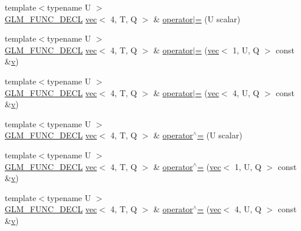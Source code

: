 \begin{DoxyCompactItemize}
\item 
{\footnotesize template$<$typename U $>$ }\\\mbox{\hyperlink{setup_8hpp_ab2d052de21a70539923e9bcbf6e83a51}{G\+L\+M\+\_\+\+F\+U\+N\+C\+\_\+\+D\+E\+CL}} \mbox{\hyperlink{structglm_1_1vec}{vec}}$<$ 4, T, Q $>$ \& \mbox{\hyperlink{structglm_1_1vec_3_014_00_01_t_00_01_q_01_4_a406f2bfe72cf1f25af84f3dc84a43b27}{operator$\vert$=}} (U scalar)
\item 
{\footnotesize template$<$typename U $>$ }\\\mbox{\hyperlink{setup_8hpp_ab2d052de21a70539923e9bcbf6e83a51}{G\+L\+M\+\_\+\+F\+U\+N\+C\+\_\+\+D\+E\+CL}} \mbox{\hyperlink{structglm_1_1vec}{vec}}$<$ 4, T, Q $>$ \& \mbox{\hyperlink{structglm_1_1vec_3_014_00_01_t_00_01_q_01_4_a147590be4731c2b2236f56d11019498f}{operator$\vert$=}} (\mbox{\hyperlink{structglm_1_1vec}{vec}}$<$ 1, U, Q $>$ const \&\mbox{\hyperlink{_s_d_l__opengl_8h_a10a82eabcb59d2fcd74acee063775f90}{v}})
\item 
{\footnotesize template$<$typename U $>$ }\\\mbox{\hyperlink{setup_8hpp_ab2d052de21a70539923e9bcbf6e83a51}{G\+L\+M\+\_\+\+F\+U\+N\+C\+\_\+\+D\+E\+CL}} \mbox{\hyperlink{structglm_1_1vec}{vec}}$<$ 4, T, Q $>$ \& \mbox{\hyperlink{structglm_1_1vec_3_014_00_01_t_00_01_q_01_4_a887b2dab7b2fdd88f5d7437fd3ad7b6e}{operator$\vert$=}} (\mbox{\hyperlink{structglm_1_1vec}{vec}}$<$ 4, U, Q $>$ const \&\mbox{\hyperlink{_s_d_l__opengl_8h_a10a82eabcb59d2fcd74acee063775f90}{v}})
\item 
{\footnotesize template$<$typename U $>$ }\\\mbox{\hyperlink{setup_8hpp_ab2d052de21a70539923e9bcbf6e83a51}{G\+L\+M\+\_\+\+F\+U\+N\+C\+\_\+\+D\+E\+CL}} \mbox{\hyperlink{structglm_1_1vec}{vec}}$<$ 4, T, Q $>$ \& \mbox{\hyperlink{structglm_1_1vec_3_014_00_01_t_00_01_q_01_4_aafc3dadf109f736576a6e0086b7f1006}{operator$^\wedge$=}} (U scalar)
\item 
{\footnotesize template$<$typename U $>$ }\\\mbox{\hyperlink{setup_8hpp_ab2d052de21a70539923e9bcbf6e83a51}{G\+L\+M\+\_\+\+F\+U\+N\+C\+\_\+\+D\+E\+CL}} \mbox{\hyperlink{structglm_1_1vec}{vec}}$<$ 4, T, Q $>$ \& \mbox{\hyperlink{structglm_1_1vec_3_014_00_01_t_00_01_q_01_4_aa451218815315cd25f43b5d3e5e4f66f}{operator$^\wedge$=}} (\mbox{\hyperlink{structglm_1_1vec}{vec}}$<$ 1, U, Q $>$ const \&\mbox{\hyperlink{_s_d_l__opengl_8h_a10a82eabcb59d2fcd74acee063775f90}{v}})
\item 
{\footnotesize template$<$typename U $>$ }\\\mbox{\hyperlink{setup_8hpp_ab2d052de21a70539923e9bcbf6e83a51}{G\+L\+M\+\_\+\+F\+U\+N\+C\+\_\+\+D\+E\+CL}} \mbox{\hyperlink{structglm_1_1vec}{vec}}$<$ 4, T, Q $>$ \& \mbox{\hyperlink{structglm_1_1vec_3_014_00_01_t_00_01_q_01_4_af2365ef058b52638e4f9b3119f1efaa7}{operator$^\wedge$=}} (\mbox{\hyperlink{structglm_1_1vec}{vec}}$<$ 4, U, Q $>$ const \&\mbox{\hyperlink{_s_d_l__opengl_8h_a10a82eabcb59d2fcd74acee063775f90}{v}})

\end{DoxyCompactItemize}
